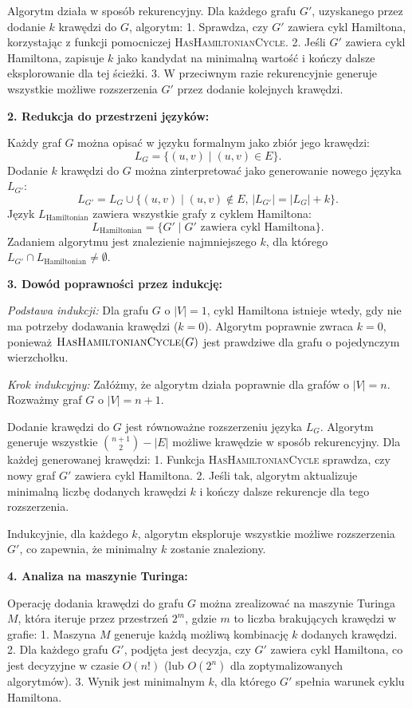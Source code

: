 Algorytm działa w sposób rekurencyjny. Dla każdego grafu \( G' \), uzyskanego przez dodanie \( k \) krawędzi do \( G \), algorytm:
1. Sprawdza, czy \( G' \) zawiera cykl Hamiltona, korzystając z funkcji pomocniczej \textsc{HasHamiltonianCycle}.
2. Jeśli \( G' \) zawiera cykl Hamiltona, zapisuje \( k \) jako kandydat na minimalną wartość i kończy dalsze eksplorowanie dla tej ścieżki.
3. W przeciwnym razie rekurencyjnie generuje wszystkie możliwe rozszerzenia \( G' \) przez dodanie kolejnych krawędzi.

\textbf{2. Redukcja do przestrzeni języków:}

Każdy graf \( G \) można opisać w języku formalnym jako zbiór jego krawędzi:
\[
L_G = \{(u, v) \mid (u, v) \in E \}.
\]
Dodanie \( k \) krawędzi do \( G \) można zinterpretować jako generowanie nowego języka \( L_{G'} \):
\[
L_{G'} = L_G \cup \{(u, v) \mid (u, v) \notin E, \, |L_{G'}| = |L_G| + k \}.
\]
Język \( L_\text{Hamiltonian} \) zawiera wszystkie grafy z cyklem Hamiltona:
\[
L_\text{Hamiltonian} = \{G' \mid G' \text{ zawiera cykl Hamiltona} \}.
\]
Zadaniem algorytmu jest znalezienie najmniejszego \( k \), dla którego \( L_{G'} \cap L_\text{Hamiltonian} \neq \emptyset \).

\textbf{3. Dowód poprawności przez indukcję:}

\textit{Podstawa indukcji:}  
Dla grafu \( G \) o \( |V| = 1 \), cykl Hamiltona istnieje wtedy, gdy nie ma potrzeby dodawania krawędzi (\( k = 0 \)). Algorytm poprawnie zwraca \( k = 0 \), ponieważ \( \textsc{HasHamiltonianCycle}(G) \) jest prawdziwe dla grafu o pojedynczym wierzchołku.

\textit{Krok indukcyjny:}  
Załóżmy, że algorytm działa poprawnie dla grafów o \( |V| = n \). Rozważmy graf \( G \) o \( |V| = n+1 \).

Dodanie krawędzi do \( G \) jest równoważne rozszerzeniu języka \( L_G \). Algorytm generuje wszystkie \( \binom{n+1}{2} - |E| \) możliwe krawędzie w sposób rekurencyjny. Dla każdej generowanej krawędzi:
1. Funkcja \textsc{HasHamiltonianCycle} sprawdza, czy nowy graf \( G' \) zawiera cykl Hamiltona.
2. Jeśli tak, algorytm aktualizuje minimalną liczbę dodanych krawędzi \( k \) i kończy dalsze rekurencje dla tego rozszerzenia.

Indukcyjnie, dla każdego \( k \), algorytm eksploruje wszystkie możliwe rozszerzenia \( G' \), co zapewnia, że minimalny \( k \) zostanie znaleziony. 

\textbf{4. Analiza na maszynie Turinga:}

Operację dodania krawędzi do grafu \( G \) można zrealizować na maszynie Turinga \( M \), która iteruje przez przestrzeń \( 2^m \), gdzie \( m \) to liczba brakujących krawędzi w grafie:
1. Maszyna \( M \) generuje każdą możliwą kombinację \( k \) dodanych krawędzi.
2. Dla każdego grafu \( G' \), podjęta jest decyzja, czy \( G' \) zawiera cykl Hamiltona, co jest decyzyjne w czasie \( O(n!) \) (lub \( O(2^n) \) dla zoptymalizowanych algorytmów).
3. Wynik jest minimalnym \( k \), dla którego \( G' \) spełnia warunek cyklu Hamiltona.

